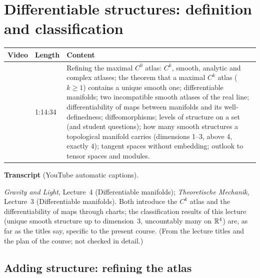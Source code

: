 \chapter{Differentiable structures: definition and classification}\label{ch:l07}
\begin{paracol}{2}

\begin{sources}
\begin{tabularx}{\linewidth}{@{}l l L@{}}
\toprule
\textbf{Video} & \textbf{Length} & \textbf{Content}\\
\midrule
{} & 1:14:34 & Refining the maximal $C^0$ atlas: $C^k$, smooth, analytic and complex atlases;
the theorem that a maximal $C^k$ atlas ($k\ge1$) contains a unique smooth one; differentiable manifolds; two incompatible smooth atlases of the real line; differentiability of maps between manifolds and its
well-definedness; diffeomorphisms; levels of structure on a set (and student questions); how many smooth structures a topological manifold carries (dimensions 1--3, above 4, exactly 4);
tangent spaces without embedding; outlook to tensor spaces and modules.\\
\bottomrule
\end{tabularx}

\smallskip
\textbf{Transcript}  (YouTube automatic captions).
\end{sources}

\begin{reading}
\emph{Gravity and Light}, Lecture~4 (Differentiable manifolds); \emph{Theoretische Mechanik}, Lecture~3 (Differentiable manifolds). Both introduce the $C^k$ atlas and the
differentiability of maps through charts; the classification results of this lecture (unique smooth structure up to dimension~3, uncountably many on $\mathbb{R}^4$) are, as far as the titles say, specific to the present course.
(From the lecture titles and the plan of the course; not checked in detail.)
\end{reading}

\section{Adding structure: refining the atlas}\label{sec:df-atlas}


\end{paracol}
